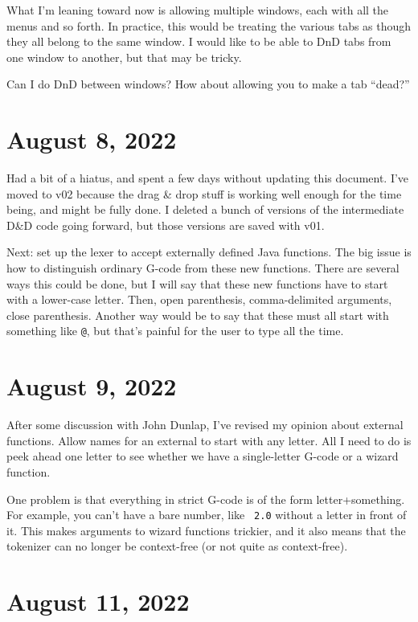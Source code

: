 \documentclass{article}
\begin{document}
What I'm leaning toward now is allowing multiple windows, each with
all the menus and so forth. In practice, this would be treating the
various tabs as though they all belong to the same window. I would
like to be able to DnD tabs from one window to another, but that may
be tricky.

Can I do DnD between windows? How about allowing you to make a tab ``dead?''

\section{August 8, 2022}

Had a bit of a hiatus, and spent a few days without updating this
document. I've moved to v02 because the drag \& drop stuff is working
well enough for the time being, and might be fully done. I deleted a
bunch of versions of the intermediate D\&D code going forward, but
those versions are saved with v01.

Next: set up the lexer to accept externally defined Java
functions. The big issue is how to distinguish ordinary G-code from these new
functions. There are several ways this could be done, but I will say
that these new functions have to start with a lower-case letter. Then,
open parenthesis, comma-delimited arguments, close
parenthesis. Another way would be to say that these must all start
with something like {\tt @}, but that's painful for the user to type
all the time. 

\section{August 9, 2022}

After some discussion with John Dunlap, I've revised my opinion about
external functions. Allow names for an external to start with any
letter. All I need to do is peek ahead one letter to see whether we
have a single-letter G-code or a wizard function.

One problem is that everything in strict G-code is of the form
letter+something. For example, you can't have a bare number, like {\tt
  2.0} without a letter in front of it. This makes arguments to wizard
functions trickier, and it also means that the tokenizer can no longer
be context-free (or not quite as context-free). 

\section{August 11, 2022}
\end{document}
